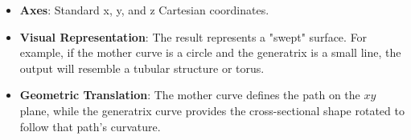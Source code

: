 \begin{itemize}
    \item \textbf{Axes}: Standard x, y, and z Cartesian coordinates.
    \item \textbf{Visual Representation}: The result represents a "swept" surface. For example, if the mother curve is a circle and the generatrix is a small line, the output will resemble a tubular structure or torus.
    \item \textbf{Geometric Translation}: The mother curve defines the path on the $xy$ plane, while the generatrix curve provides the cross-sectional shape rotated to follow that path's curvature.
\end{itemize}
